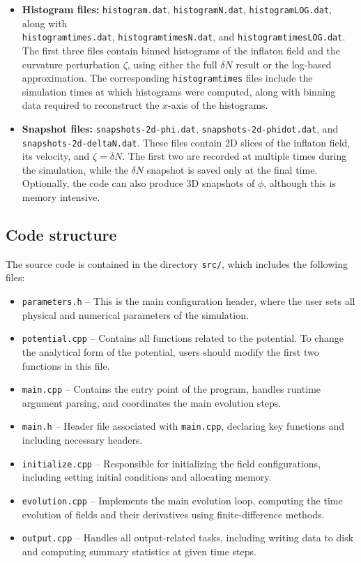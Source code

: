 \documentclass[aps, nofootinbib,superscriptaddress, preprintnumbers, longbibliography]{article}
\begin{document}
\begin{itemize}
    \item \textbf{Histogram files:} \texttt{histogram.dat}, \texttt{histogramN.dat}, \texttt{histogramLOG.dat}, along with \\\texttt{histogramtimes.dat}, \texttt{histogramtimesN.dat}, and \texttt{histogramtimesLOG.dat}. The first three files contain binned histograms of the inflaton field and the curvature perturbation $\zeta$, using either the full $\delta N$ result or the log-based approximation. The corresponding \texttt{histogramtimes} files include the simulation times at which histograms were computed, along with binning data required to reconstruct the $x$-axis of the histograms.

    \item \textbf{Snapshot files:} \texttt{snapshots-2d-phi.dat}, \texttt{snapshots-2d-phidot.dat}, and \\\texttt{snapshots-2d-deltaN.dat}. These files contain 2D slices of the inflaton field, its velocity, and $\zeta=\delta N$. The first two are recorded at multiple times during the simulation, while the $\delta N$ snapshot is saved only at the final time. Optionally, the code can also produce 3D snapshots of $\phi$, although this is memory intensive.
\end{itemize}



    \subsection{Code structure}
    \label{sec:structure}
   The source code is contained in the directory \texttt{src/}, which includes the following files:
\begin{itemize}
\item \texttt{parameters.h} – This is the main configuration header, where the user sets all physical and numerical parameters of the simulation.
\item \texttt{potential.cpp} – Contains all functions related to the potential. To change the analytical form of the potential, users should modify the first two functions in this file.
\item \texttt{main.cpp} – Contains the entry point of the program, handles runtime argument parsing, and coordinates the main evolution steps.
\item \texttt{main.h} – Header file associated with \texttt{main.cpp}, declaring key functions and including necessary headers.
\item \texttt{initialize.cpp} – Responsible for initializing the field configurations, including setting initial conditions and allocating memory.
\item \texttt{evolution.cpp} – Implements the main evolution loop, computing the time evolution of fields and their derivatives using finite-difference methods.
\item \texttt{output.cpp} – Handles all output-related tasks, including writing data to disk and computing summary statistics at given time steps.
\end{itemize}
   
\end{document}
